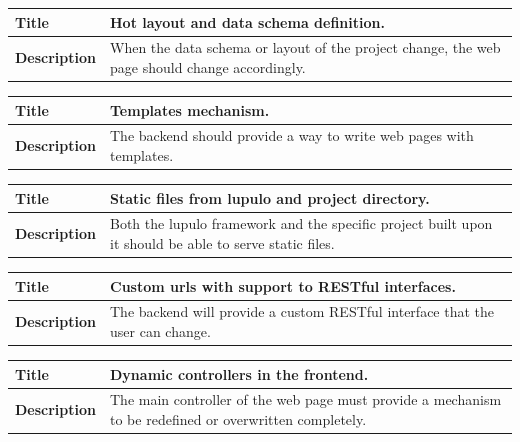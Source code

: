 \documentclass[12pt]{article}
\begin{document}
                \begin{tabularx}{\textwidth}{|l|X|}
                    \hline
                    \textbf{Title} & Hot layout and data schema definition. \\
                    \hline
                    \textbf{Description} & When the data schema or layout of the
                    project change, the web page should change accordingly. \\
                    \hline
                \end{tabularx}

                \begin{tabularx}{\textwidth}{|l|X|}
                    \hline
                    \textbf{Title} & Templates mechanism. \\
                    \hline
                    \textbf{Description} & The backend should provide a way to
                    write web pages with templates. \\
                    \hline
                \end{tabularx}

                \begin{tabularx}{\textwidth}{|l|X|}
                    \hline
                    \textbf{Title} & Static files from lupulo and project
                    directory. \\
                    \hline
                    \textbf{Description} & Both the lupulo framework and the
                    specific project built upon it should be able to serve
                    static files. \\
                    \hline
                \end{tabularx}

                \begin{tabularx}{\textwidth}{|l|X|}
                    \hline
                    \textbf{Title} & Custom urls with support to RESTful
                    interfaces. \\
                    \hline
                    \textbf{Description} & The backend will provide a custom
                    RESTful interface that the user can change. \\
                    \hline
                \end{tabularx}

                \begin{tabularx}{\textwidth}{|l|X|}
                    \hline
                    \textbf{Title} & Dynamic controllers in the frontend. \\
                    \hline
                    \textbf{Description} & The main controller of the web page
                    must provide a mechanism to be redefined or overwritten
                    completely. \\
                    \hline
                \end{tabularx}
\end{document}
